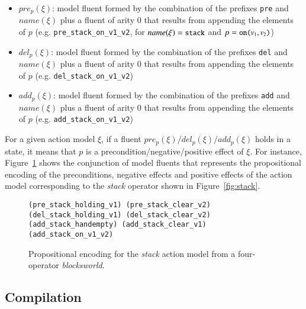 \begin{itemize}
\item $pre_p(\xi)$: \textcolor[rgb]{1.00,0.00,0.00}{model fluent} formed by the combination of the prefixes {\small \texttt{pre}} and $name(\xi)$ plus a fluent of arity 0 that results from appending the elements of $p$ (e.g. {\small \texttt{pre\_stack\_on\_v1\_v2}}, for $name(\xi)={\small\texttt{stack}}$ and $p={\small\texttt{on($v_1,v_2$)}}$)
\item $del_p(\xi)$: \textcolor[rgb]{1.00,0.00,0.00}{model fluent} formed by the combination of the prefixes {\small \texttt{del}} and $name(\xi)$ plus a fluent of arity 0 that results from appending the elements of $p$ (e.g. {\small  \texttt{del\_stack\_on\_v1\_v2}})
\item $add_p(\xi)$: \textcolor[rgb]{1.00,0.00,0.00}{model fluent} formed by the combination of the prefixes {\small \texttt{add}} and $name(\xi)$ plus a fluent of arity 0 that results from appending the elements of $p$ (e.g. {\small \texttt{add\_stack\_on\_v1\_v2}})
\end{itemize}


For a given action model $\xi$, if a fluent $pre_p(\xi)/del_p(\xi)/add_p(\xi)$ holds in a state, it means that $p$ is a precondition/negative/positive effect of $\xi$. For instance, Figure~\ref{fig:encodedstack} shows the conjunction of \textcolor[rgb]{1.00,0.00,0.00}{model fluents} that represents the propositional encoding of the preconditions, negative effects and positive effects of the action model corresponding to the {\em stack} operator shown in Figure~\ref{fig:stack}.

\begin{figure}[hbt!]
\begin{footnotesize}
\begin{verbatim}
(pre_stack_holding_v1) (pre_stack_clear_v2)
(del_stack_holding_v1) (del_stack_clear_v2)
(add_stack_handempty) (add_stack_clear_v1) (add_stack_on_v1_v2)
\end{verbatim}
\end{footnotesize}
 \caption{\small Propositional encoding for the {\em stack} action model from a four-operator {\em blocksworld}.}
\label{fig:encodedstack}
\end{figure}


\subsection{Compilation}
\label{compilation}

